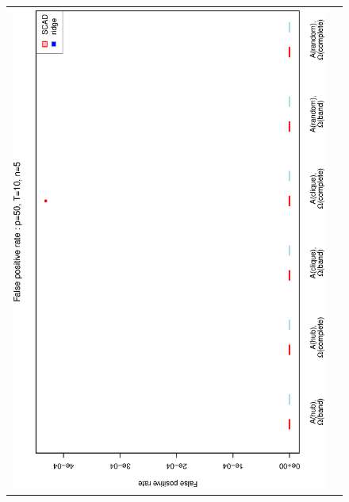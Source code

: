 \begin{figure}[h!]
\centering
\begin{tabular}{cc}
\includegraphics[scale=0.45,angle=270]{ROCfpr50T10N5_5.eps}
\\

\end{tabular}
\end{figure}
